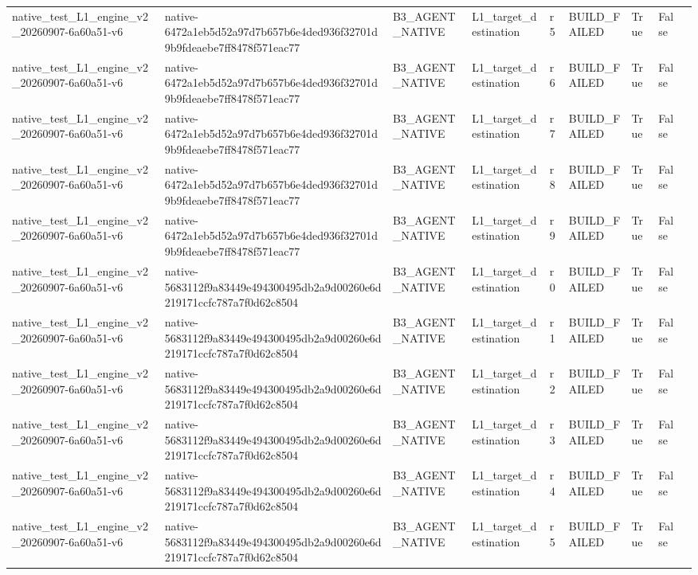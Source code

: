 \begin{tabular}{lllllllll}
native\_test\_L1\_engine\_v2\_20260907-6a60a51-v6 & native-6472a1eb5d52a97d7b657b6e4ded936f32701d9b9fdeaebe7ff8478f571eac77 & B3\_AGENT\_NATIVE & L1\_target\_destination & r5 & BUILD\_FAILED & True & False &  \\
native\_test\_L1\_engine\_v2\_20260907-6a60a51-v6 & native-6472a1eb5d52a97d7b657b6e4ded936f32701d9b9fdeaebe7ff8478f571eac77 & B3\_AGENT\_NATIVE & L1\_target\_destination & r6 & BUILD\_FAILED & True & False &  \\
native\_test\_L1\_engine\_v2\_20260907-6a60a51-v6 & native-6472a1eb5d52a97d7b657b6e4ded936f32701d9b9fdeaebe7ff8478f571eac77 & B3\_AGENT\_NATIVE & L1\_target\_destination & r7 & BUILD\_FAILED & True & False &  \\
native\_test\_L1\_engine\_v2\_20260907-6a60a51-v6 & native-6472a1eb5d52a97d7b657b6e4ded936f32701d9b9fdeaebe7ff8478f571eac77 & B3\_AGENT\_NATIVE & L1\_target\_destination & r8 & BUILD\_FAILED & True & False &  \\
native\_test\_L1\_engine\_v2\_20260907-6a60a51-v6 & native-6472a1eb5d52a97d7b657b6e4ded936f32701d9b9fdeaebe7ff8478f571eac77 & B3\_AGENT\_NATIVE & L1\_target\_destination & r9 & BUILD\_FAILED & True & False &  \\
native\_test\_L1\_engine\_v2\_20260907-6a60a51-v6 & native-5683112f9a83449e494300495db2a9d00260e6d219171ccfc787a7f0d62c8504 & B3\_AGENT\_NATIVE & L1\_target\_destination & r0 & BUILD\_FAILED & True & False &  \\
native\_test\_L1\_engine\_v2\_20260907-6a60a51-v6 & native-5683112f9a83449e494300495db2a9d00260e6d219171ccfc787a7f0d62c8504 & B3\_AGENT\_NATIVE & L1\_target\_destination & r1 & BUILD\_FAILED & True & False &  \\
native\_test\_L1\_engine\_v2\_20260907-6a60a51-v6 & native-5683112f9a83449e494300495db2a9d00260e6d219171ccfc787a7f0d62c8504 & B3\_AGENT\_NATIVE & L1\_target\_destination & r2 & BUILD\_FAILED & True & False &  \\
native\_test\_L1\_engine\_v2\_20260907-6a60a51-v6 & native-5683112f9a83449e494300495db2a9d00260e6d219171ccfc787a7f0d62c8504 & B3\_AGENT\_NATIVE & L1\_target\_destination & r3 & BUILD\_FAILED & True & False &  \\
native\_test\_L1\_engine\_v2\_20260907-6a60a51-v6 & native-5683112f9a83449e494300495db2a9d00260e6d219171ccfc787a7f0d62c8504 & B3\_AGENT\_NATIVE & L1\_target\_destination & r4 & BUILD\_FAILED & True & False &  \\
native\_test\_L1\_engine\_v2\_20260907-6a60a51-v6 & native-5683112f9a83449e494300495db2a9d00260e6d219171ccfc787a7f0d62c8504 & B3\_AGENT\_NATIVE & L1\_target\_destination & r5 & BUILD\_FAILED & True & False &  \\

\end{tabular}
